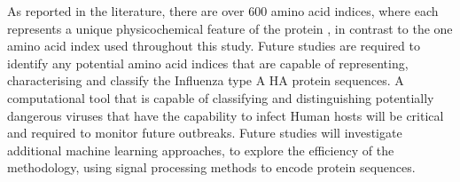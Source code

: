 \documentclass[letterpaper, 10 pt, conference]{ieeeconf}  %
\begin{document}
As reported in the literature, there are over 600 amino acid indices, where each represents a unique physicochemical feature of the protein \cite{chrysostomou2015cisaps}, in contrast to the one amino acid index used throughout this study. Future studies are required to identify any potential amino acid indices that are capable of representing, characterising and classify the Influenza type A HA protein sequences. A computational tool that is capable of classifying and distinguishing potentially dangerous viruses that have the capability to infect Human hosts will be critical and required to monitor future outbreaks. Future studies will investigate additional machine learning approaches, to explore the efficiency of the methodology, using signal processing methods to encode protein sequences.















\end{document}

